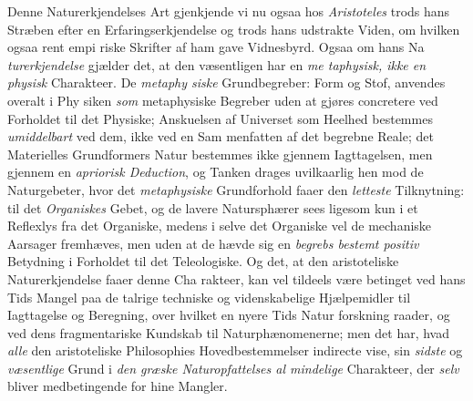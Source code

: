 Denne Naturerkjendelses Art gjenkjende vi nu ogsaa hos
\emph{Aristoteles} trods hans Stræben efter en Erfaringserkjendelse
og trods hans udstrakte Viden, om hvilken ogsaa rent empi\-%
riske Skrifter af ham gave Vidnesbyrd. Ogsaa om hans Na\-%
\emph{turerkjendelse} gjælder det, at den væsentligen har en \emph{me\-%
taphysisk, ikke en physisk} Charakteer. De \emph{metaphy\-%
siske} Grundbegreber: Form og Stof, anvendes overalt i Phy\-%
siken \emph{som} metaphysiske Begreber uden at gjøres concretere
ved Forholdet til det Physiske; Anskuelsen af Universet som
Heelhed bestemmes \emph{umiddelbart} ved dem, ikke ved en Sam\-%
menfatten af det begrebne Reale; det Materielles Grundformers
Natur bestemmes ikke gjennem Iagttagelsen, men gjennem en
\emph{apriorisk Deduction}, og Tanken drages uvilkaarlig hen
mod de Naturgebeter, hvor det \emph{metaphysiske} Grundforhold
faaer den \emph{letteste} Tilknytning: til det \emph{Organiskes} Gebet,
og de lavere Natursphærer sees ligesom kun i et Reflexlys fra
det Organiske, medens i selve det Organiske vel de mechaniske
Aarsager fremhæves, men uden at de hævde sig en \emph{begrebs\-%
bestemt positiv} Betydning i Forholdet til det Teleologiske.
Og det, at den aristoteliske Naturerkjendelse faaer denne Cha\-%
rakteer, kan vel tildeels være betinget ved hans Tids Mangel
paa de talrige techniske og videnskabelige Hjælpemidler til
Iagttagelse og Beregning, over hvilket en nyere Tids Natur\-%
forskning raader, og ved dens fragmentariske Kundskab til
Naturphænomenerne; men det har, hvad \emph{alle} den aristoteliske
Philosophies Hovedbestemmelser indirecte vise, sin \emph{sidste} og
\emph{væsentlige} Grund i \emph{den græske Naturopfattelses al\-%
mindelige} Charakteer, der \emph{selv} bliver medbetingende for
hine Mangler.

